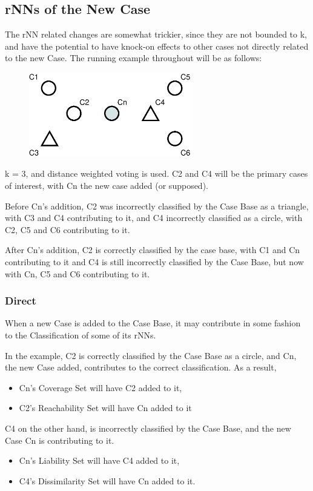 \documentclass[a4paper,11pt]{report}
\begin{document}
\subsection{rNNs of the New Case}
The rNN related changes are somewhat trickier, since they are not bounded to k, and have the potential to have knock-on effects to other cases not directly related to the new Case.
The running example throughout will be as follows:

\begin{figure}[h!] 
\centering
\includegraphics[width=200pt]{./Drawn/rNNExample}
\end{figure}

k = 3, and distance weighted voting is used. C2 and C4 will be the primary cases of interest, with Cn the new case added (or supposed).

Before Cn's addition, C2 was incorrectly classified by the Case Base as a triangle, with C3 and C4 contributing to it, and C4 incorrectly classified as a circle, with C2, C5 and C6 contributing to it.

After Cn's addition, C2 is correctly classified by the case base, with C1 and Cn contributing to it and C4 is still incorrectly classified by the Case Base, but now with Cn, C5 and C6 contributing to it.

\subsubsection{Direct}
When a new Case is added to the Case Base, it may contribute in some fashion to the Classification of some of its rNNs.

In the example, C2 is correctly classified by the Case Base as a circle, and Cn, the new Case added, contributes to the correct classification. As a result,
\begin{itemize}
	\item Cn's Coverage Set will have C2 added to it, 
	\item C2's Reachability Set will have Cn added to it
\end{itemize}

C4 on the other hand, is incorrectly classified by the Case Base, and the new Case Cn is contributing to it.
\begin{itemize}
	\item Cn's Liability Set will have C4 added to it,
	\item C4's Dissimilarity Set will have Cn added to it.
\end{itemize}
\end{document}
